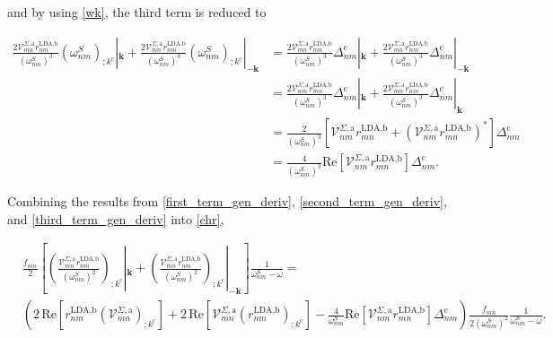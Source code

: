 and by using \eqref{wk}, the third term is reduced to

\begin{align}\label{third_term_gen_deriv}
\frac{2\mathcal{V}^{\Sigma,\text{a}}_{mn}r^{\text{LDA,b}}_{nm}}{(\omega^{S}_{nm})^{3}}\left(\omega^{S}_{nm}\right)_{;k^{\text{c}}}|_{\mathbf{k}} + \frac{2\mathcal{V}^{\Sigma,\text{a}}_{mn}r^{\text{LDA,b}}_{nm}}{(\omega^{S}_{nm})^{3}}\left(\omega^{S}_{nm}\right)_{;k^{\text{c}}}|_{-\mathbf{k}}
&= \frac{2\mathcal{V}^{\Sigma,\text{a}}_{mn}r^{\text{LDA,b}}_{nm}}{(\omega^{S}_{nm})^{3}}\Delta_{nm}^{\text{c}}|_{\mathbf{k}} + \frac{2\mathcal{V}^{\Sigma,\text{a}}_{mn}r^{\text{LDA,b}}_{nm}}{(\omega^{S}_{nm})^{3}}\Delta_{nm}^{\text{c}}|_{-\mathbf{k}}\nonumber\\
&= \frac{2\mathcal{V}^{\Sigma,\text{a}}_{nm}r^{\text{LDA,b}}_{mn}}{(\omega^{S}_{nm})^{3}}\Delta_{nm}^{\text{c}}|_{\mathbf{k}} + \frac{2\mathcal{V}^{\Sigma,\text{a}}_{mn}r^{\text{LDA,b}}_{nm}}{(\omega^{S}_{nm})^{3}}\Delta_{nm}^{\text{c}}|_{\mathbf{k}}\nonumber\\
&= \frac{2}{(\omega^{S}_{nm})^{3}}\left[\mathcal{V}^{\Sigma,\text{a}}_{nm}r^{\text{LDA,b}}_{mn} + \left(\mathcal{V}^{\Sigma,\text{a}}_{nm}r^{\text{LDA,b}}_{mn}\right)^{*}\right]\Delta_{nm}^{\text{c}}\nonumber\\
&= \frac{4}{(\omega^{S}_{nm})^{3}}\mathrm{Re}\left[\mathcal{V}^{\Sigma,\text{a}}_{nm}r^{\text{LDA,b}}_{mn}\right]\Delta_{nm}^{\text{c}}.
\end{align}

Combining the results from \eqref{first_term_gen_deriv}, \eqref{second_term_gen_deriv}, and \eqref{third_term_gen_deriv} into \eqref{chr},

\begin{align}\label{derivative_under_k}
&\frac{f_{mn}}{2}\left[\left(\frac{\mathcal{V}^{\Sigma,\text{a}}_{mn}r^{\text{LDA,b}}_{nm}}{(\omega^S_{nm})^2}\right)_{;k^{\text{c}}}|_{\mathbf{k}} + \left(\frac{\mathcal{V}^{\Sigma,\text{a}}_{mn}r^{\text{LDA,b}}_{nm}}{(\omega^S_{nm})^2}\right)_{;k^{\text{c}}}|_{-\mathbf{k}}\right]\frac{1}{\omega^S_{nm}-\omega} = \nonumber\\
&\left(2\,\mathrm{Re}\left[r^{\text{LDA,b}}_{nm}\left(\mathcal{V}^{\Sigma,\text{a}}_{mn}\right)_{;k^{\text{c}}}\right] + 2\,\mathrm{Re}\left[\mathcal{V}^{\Sigma,\text{a}}_{mn}\left(r^{\text{LDA,b}}_{nm}\right)_{;k^{\text{c}}}\right] - \frac{4}{\omega^{S}_{nm}}\mathrm{Re}\left[\mathcal{V}^{\Sigma,\text{a}}_{nm}r^{\text{LDA,b}}_{mn}\right]\Delta_{nm}^{\text{c}}\right)\frac{f_{mn}}{2(\omega^{S}_{nm})^{2}}\frac{1}{\omega^S_{nm}-\omega}.
\end{align}

